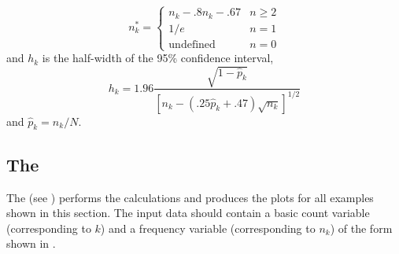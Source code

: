 \begin{equation*}
n_k^{*}= \left\{
\begin{array}{ll}
n_k-.8n_k-.67 & n\geq 2 \\
1/e & n=1 \\
\textrm{undefined} & n=0
\end{array}
\right.
\end{equation*}
%
and $h_k$ is the half-width of the 95\% confidence interval,
\begin{equation*}
h_k=1.96\frac{\sqrt{1-\widehat{p}_k}}{[n_k-(.25\widehat{p}_k+.47)\sqrt{n_k}%
]^{1/2}}
\end{equation*}
and $\hat{p}_k = n_k / N$.

\subsection{The }
The  (see ) performs the calculations and produces the
plots for all examples shown in this section.
The input data should contain a basic count variable (corresponding to $k$)
and a frequency variable (corresponding to $n_k$)
of the form shown in .

